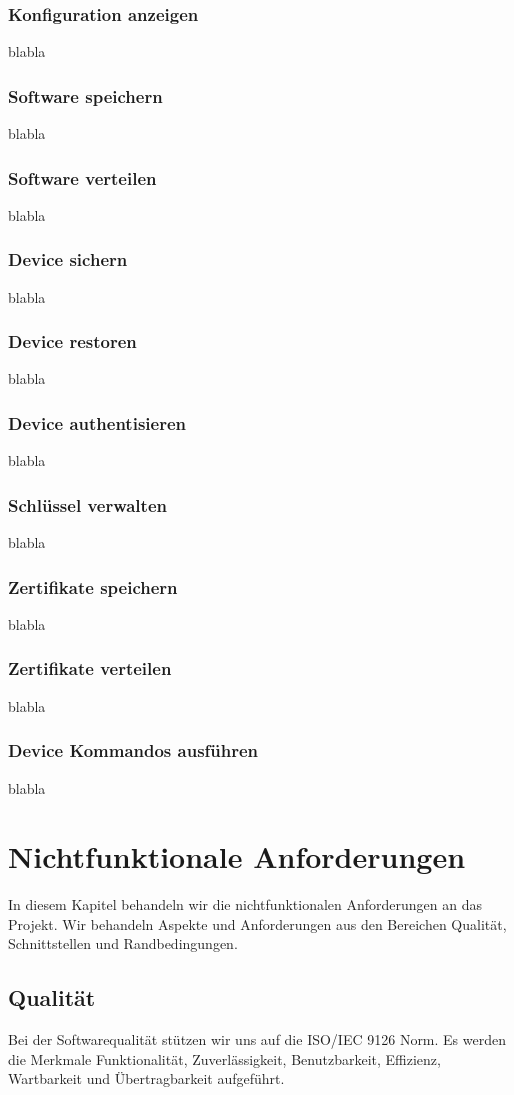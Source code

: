 \subsubsection{Konfiguration anzeigen}
blabla
\subsubsection{Software speichern}
blabla
\subsubsection{Software verteilen}
blabla
\subsubsection{Device sichern}
blabla
\subsubsection{Device restoren}
blabla
\subsubsection{Device authentisieren}
blabla
\subsubsection{Schlüssel verwalten}
blabla
\subsubsection{Zertifikate speichern}
blabla
\subsubsection{Zertifikate verteilen}
blabla
\subsubsection{Device Kommandos ausführen}
blabla

\section{Nichtfunktionale Anforderungen}
In diesem Kapitel behandeln wir die nichtfunktionalen Anforderungen an das Projekt. Wir behandeln Aspekte und Anforderungen aus den Bereichen Qualität, Schnittstellen und Randbedingungen.
\subsection{Qualität}
Bei der Softwarequalität stützen wir uns auf die ISO/IEC 9126 Norm. Es werden die Merkmale Funktionalität, Zuverlässigkeit, Benutzbarkeit, Effizienz, Wartbarkeit und Übertragbarkeit aufgeführt.
